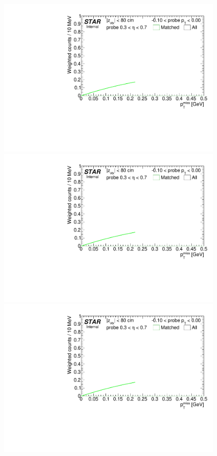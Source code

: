 \begin{figure}[ht]
{}~
\parbox{0.24\textwidth}{
  \centering
  \includegraphics[width=\linewidth,page=5]{graphics/correctionsToEff/TOF_tagAndProbe/Fitting_effVsPt_mc_ETABINS_A.CPT2.pdf}\\
  \includegraphics[width=\linewidth,page=7]{graphics/correctionsToEff/TOF_tagAndProbe/Fitting_effVsPt_mc_ETABINS_A.CPT2.pdf}\\
  \includegraphics[width=\linewidth,page=9]{graphics/correctionsToEff/TOF_tagAndProbe/Fitting_effVsPt_mc_ETABINS_A.CPT2.pdf}\\
}
\end{figure}

